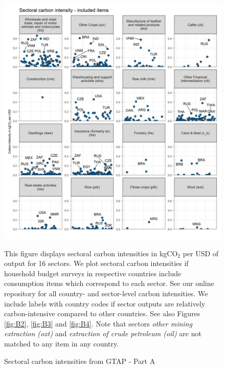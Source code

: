 \documentclass[12pt, a4paper]{article}
\newenvironment{subcaption}
{\strut
\vspace{-5pt}
\begin{minipage}[b]{0.9\textwidth}
  \hspace*{-\parindent}
  \footnotesize}
 {\end{minipage}}
\begin{document}
\begin{figure}[ht!]
  \centering
  \caption{Sectoral carbon intensities from GTAP - Part A} \label{fig:B1}
  \includegraphics{Analysis_Carbon_Intensities_GTAP/Figure_2.1.1_A_2017}
  \begin{subcaption}
    This figure displays sectoral carbon intensities in kgCO$_{2}$ per USD of output for 16 sectors. We plot sectoral carbon intensities if household budget surveys in respective countries include consumption items which correspond to each sector. See our online repository for all country- and sector-level carbon intensities. We include labels with country codes if sector outputs are relatively carbon-intensive compared to other countries. See also Figures \ref{fig:B2}, \ref{fig:B3} and \ref{fig:B4}. Note that sectors \textit{other mining extraction (oxt)} and \textit{extraction of crude petroleum (oil)} are not matched to any item in any country.
  \end{subcaption}

\end{figure}

\clearpage
\end{document}
